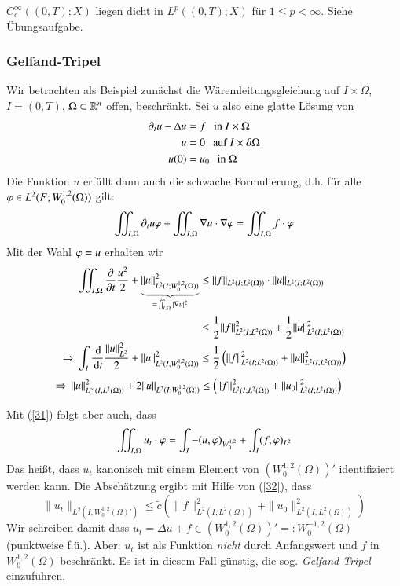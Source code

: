 \begin{remark}
    $C_c^\infty((0,T);X)$ liegen dicht in $L^p((0,T); X)$ für $1\leq p < \infty$. Siehe Übungsaufgabe.
\end{remark}

\subsubsection*{Gelfand-Tripel}
Wir betrachten als Beispiel zunächst die Wäremleitungsgleichung auf $I\times \Omega$, $I=(0,T)$,
$\Omega\subset \mathbb{R}^n$ offen, beschränkt. Sei $u$ also eine glatte Lösung von
\begin{align*}
    \partial_t u - \Delta u &= f\hspace{.25cm} \text{in } I\times \Omega\\
    u&= 0 \hspace{.25cm} \text{auf } I\times \partial \Omega\\
    u(0)&=u_0 \hspace{.25cm} \text{in } \Omega
\end{align*}
Die Funktion $u$ erfüllt dann auch die schwache Formulierung, d.h. für alle $\varphi \in L^2(F; W_0^{1,2}
(\Omega))$ gilt:
\begin{align}\label{31}
    \iint_{I,\Omega} \partial_t u \varphi + \iint_{I,\Omega} \nabla u \cdot \nabla \varphi = \iint_{I,\Omega}
    f\cdot \varphi
\end{align}
Mit der Wahl $\varphi=u$ erhalten wir
\begin{align*}
    \iint_{I,\Omega} \frac{\partial}{\partial t}\frac{u^2}2 + \underbrace{\|u\|
    _{L^2(I;W_0^{1,2}(\Omega))}^2}_{=\iint_{I,\Omega} |\nabla u |^2} &\leq \|f\|_{L^2(I;L^2(\Omega))}
    \cdot \|u\|_{L^2(I;L^2(\Omega))}\\
    &\leq \frac 12 \|f\|^2_{L^2(I;L^2(\Omega))} + \frac12 \|u\|^2_{L^2(I;L^2(\Omega))}\\
    \Rightarrow \, \int_I\frac{\, \mathrm{d}}{\, \mathrm{d} t} \frac{\|u\|_{L^2}^2}{2} + \|u\|^2_{L^2(I,W_0^{1,2}(\Omega))}
    &\leq \frac 12 \left( \|f\|^2_{L^2(I;L^2(\Omega))} + \|u\|^2_{L^2(I,L^2(\Omega))}\right)
\end{align*}
\begin{align}\label{32}
    \Rightarrow \, \|u\|^2_{L^\infty(I,L^2(\Omega))}+2\|u\|_{L^2(I;W_0^{1,2}(\Omega))} &\leq \left( \|f\|^2
    _{L^2(I;L^2(\Omega))} + \|u_0\|^2_{L^2(I;L^2(\Omega))} \right)
\end{align}

Mit (\ref{31}) folgt aber auch, dass
\[
    \iint_{I,\Omega} u_t\cdot \varphi = \int_I -(u,\varphi)_{W_0^{1,2}} + \int_I(f,\varphi)_{L^2} 
\]
Das heißt, dass $u_t$ kanonisch mit einem Element von $(W_0^{1,2}(\Omega))'$ identifiziert werden kann.
Die Abschätzung ergibt mit Hilfe von (\ref{32}), dass
\[
    \|u_t\|_{L^2(I;W_0^{1,2}(\Omega)')} \leq \tilde c (\|f\|^2_{L^2(I;L^2(\Omega))} + \|u_0\|^2
    _{L^2(I;L^2(\Omega))}   )  
\]
Wir schreiben damit dass $u_t=\Delta u + f \in (W^{1,2}_0(\Omega))'=:W^{-1,2}_0(\Omega)$
(punktweise f.ü.). Aber: $u_t$ ist als Funktion \textit{nicht} durch Anfangswert und $f$ in
$W_0^{1,2}(\Omega)$ beschränkt.
Es ist in diesem Fall günstig, die sog. \textit{Gelfand-Tripel} einzuführen.

